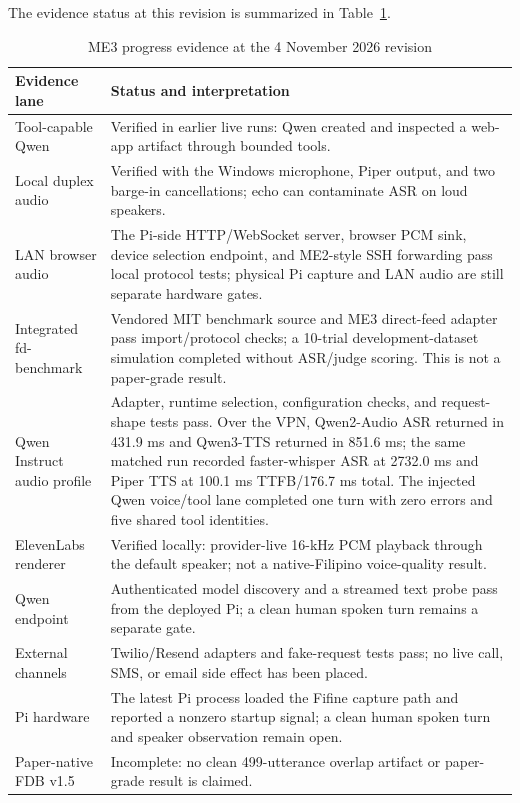 \documentclass[sigconf,nonacm]{acmart}
\begin{document}
The evidence status at this revision is summarized in
Table~\ref{tab:progress}.

\begin{table}[t]
\caption{ME3 progress evidence at the 4 November 2026 revision}
\label{tab:progress}
\small
\begin{tabularx}{\columnwidth}{@{}lX@{}}
\toprule
Evidence lane & Status and interpretation \\
\midrule
Tool-capable Qwen & Verified in earlier live runs: Qwen created and inspected
a web-app artifact through bounded tools. \\
Local duplex audio & Verified with the Windows microphone, Piper output, and
two barge-in cancellations; echo can contaminate ASR on loud speakers. \\
LAN browser audio & The Pi-side HTTP/WebSocket server, browser PCM sink, device
selection endpoint, and ME2-style SSH forwarding pass local protocol tests;
physical Pi capture and LAN audio are still separate hardware gates. \\
Integrated fd-benchmark & Vendored MIT benchmark source and ME3 direct-feed
adapter pass import/protocol checks; a 10-trial development-dataset simulation
completed without ASR/judge scoring. This is not a paper-grade result. \\
Qwen Instruct audio profile & Adapter, runtime selection, configuration checks,
and request-shape tests pass. Over the VPN, Qwen2-Audio ASR returned in 431.9 ms
and Qwen3-TTS returned in 851.6 ms; the same matched run recorded
faster-whisper ASR at 2732.0 ms and Piper TTS at 100.1 ms TTFB/176.7 ms total.
The injected Qwen voice/tool lane completed one turn with zero errors and five
shared tool identities. \\
ElevenLabs renderer & Verified locally: provider-live 16-kHz PCM playback
through the default speaker; not a native-Filipino voice-quality result. \\
Qwen endpoint & Authenticated model discovery and a streamed text probe pass
from the deployed Pi; a clean human spoken turn remains a separate gate. \\
External channels & Twilio/Resend adapters and fake-request tests pass; no
live call, SMS, or email side effect has been placed. \\
Pi hardware & The latest Pi process loaded the Fifine capture path and reported
a nonzero startup signal; a clean human spoken turn and speaker observation
remain open. \\
Paper-native FDB v1.5 & Incomplete: no clean 499-utterance overlap artifact
or paper-grade result is claimed. \\
\bottomrule
\end{tabularx}
\end{table}
\end{document}
